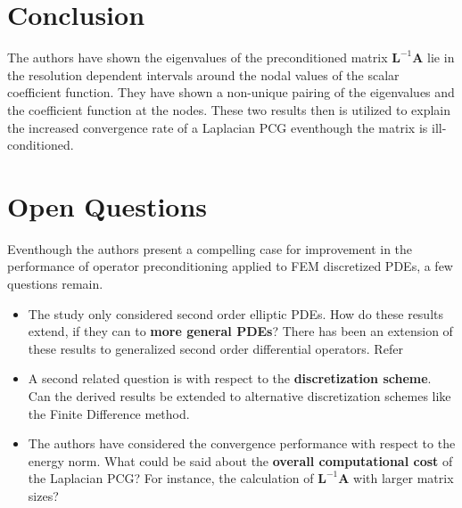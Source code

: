 \section{Conclusion}
The authors have shown the eigenvalues of the preconditioned matrix $\mathbf{L}^{-1}{\mathbf{A}}$ lie in the resolution dependent intervals around the nodal values of the scalar coefficient function. They have shown a non-unique pairing of the eigenvalues and the coefficient function at the nodes. These two results then is utilized to explain the increased convergence rate of a Laplacian PCG eventhough the matrix is ill-conditioned.

\section{Open Questions}
Eventhough the authors present a compelling case for improvement in the performance of operator preconditioning applied to FEM discretized PDEs, a few questions remain.
\begin{itemize}
\item The study only considered second order elliptic PDEs. How do these results extend, if they can to \textbf{more general PDEs}? There has been an extension of these results to generalized second order differential operators. Refer \cite{gergelits2020generalized}
\item A second related question is with respect to the \textbf{discretization scheme}. Can the derived results be extended to alternative discretization schemes like the Finite Difference method.
\item The authors have considered the convergence performance with respect to the energy norm. What could be said about the \textbf{overall computational cost} of the Laplacian PCG? For instance, the calculation of $\mathbf{L}^{-1}\mathbf{A}$ with larger matrix sizes?  

\end{itemize}





